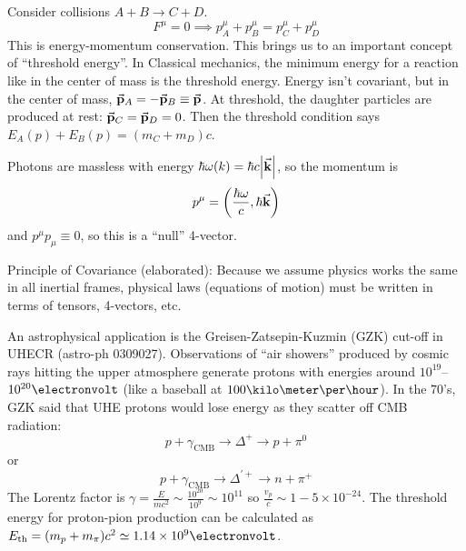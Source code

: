 \documentclass[a4paper,twoside,master.tex]{subfiles}
\begin{document}
Consider collisions $ A + B \to C + D $. 
\begin{equation}
    F^{\mu} = 0 \implies p^{\mu}_{A} + p^{\mu}_{B} = p^{\mu}_{C} + p^{\mu}_{D}
\end{equation}
This is energy-momentum conservation. This brings us to an important concept of ``threshold energy''. In Classical mechanics, the minimum energy for a reaction like in the center of mass is the threshold energy. Energy isn't covariant, but in the center of mass, $ \va{p}_A = - \va{p}_B \equiv \va{p} $. At threshold, the daughter particles are produced at rest: $ \va{p}_C = \va{p}_D = 0 $. Then the threshold condition says $ E_A(p) + E_B(p) = (m_C + m_D)c $.

Photons are massless with energy $ \hbar \omega(k) = \hbar c \abs{\va{k}} $, so the momentum is
\begin{equation}
    p^{\mu} = \left( \frac{\hbar \omega}{c}, \hbar \va{k} \right)
\end{equation}
and $ p^{\mu} p_{\mu} \equiv 0 $, so this is a ``null'' 4-vector.

Principle of Covariance (elaborated): Because we assume physics works the same in all inertial frames, physical laws (equations of motion) must be written in terms of tensors, 4-vectors, etc.

An astrophysical application is the Greisen-Zatsepin-Kuzmin (GZK) cut-off in UHECR (astro-ph 0309027). Observations of ``air showers'' produced by cosmic rays hitting the upper atmosphere generate protons with energies around $ 10^{19} $--$ 10^{20}\electronvolt $ (like a baseball at $ 100 \kilo\meter\per\hour $). In the 70's, GZK said that UHE protons would lose energy as they scatter off CMB radiation:
\begin{equation}
    p + \gamma_{\text{CMB}} \to \Delta^{+} \to p + \pi^0
\end{equation}
or
\begin{equation}
    p + \gamma_{\text{CMB}} \to \Delta^{\prime +} \to n + \pi^+
\end{equation}
The Lorentz factor is $ \gamma = \frac{E}{mc^2} \sim \frac{10^{20}}{10^{9}} \sim 10^{11} $ so $ \frac{v_p}{c} \sim 1 - 5 \times 10^{-24} $. The threshold energy for proton-pion production can be calculated as $ E_{\text{th}} = (m_p + m_{\pi}) c^2 \simeq 1.14 \times 10^9\electronvolt $.
\end{document}
